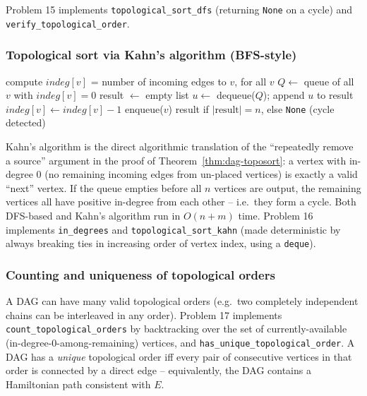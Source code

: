 \documentclass[11pt]{article}
\begin{document}
Problem 15 implements \texttt{topological\_sort\_dfs} (returning \texttt{None} on a
cycle) and \texttt{verify\_topological\_order}.

\subsubsection{Topological sort via Kahn's algorithm (BFS-style)}

\begin{algorithm}[h]
\caption{Kahn$(adj)$}
\begin{algorithmic}[1]
\State compute $indeg[v]$ = number of incoming edges to $v$, for all $v$
\State $Q \gets$ queue of all $v$ with $indeg[v] = 0$
\State result $\gets$ empty list
    \State $u \gets$ dequeue($Q$); append $u$ to result
        \State $indeg[v] \gets indeg[v] - 1$
            \State enqueue($v$)
        \EndIf
    \EndFor
\EndWhile
\State \Return result if $|\text{result}| = n$, else \texttt{None} (cycle detected)
\end{algorithmic}
\end{algorithm}

Kahn's algorithm is the direct algorithmic translation of the ``repeatedly remove a
source'' argument in the proof of Theorem~\ref{thm:dag-toposort}: a vertex with in-degree
0 (no remaining incoming edges from un-placed vertices) is exactly a valid ``next''
vertex. If the queue empties before all $n$ vertices are output, the remaining vertices
all have positive in-degree from each other -- i.e.\ they form a cycle. Both
DFS-based and Kahn's algorithm run in $O(n+m)$ time. Problem 16 implements
\texttt{in\_degrees} and \texttt{topological\_sort\_kahn} (made deterministic by always
breaking ties in increasing order of vertex index, using a \texttt{deque}).

\subsubsection{Counting and uniqueness of topological orders}

A DAG can have many valid topological orders (e.g.\ two completely independent chains can
be interleaved in any order). Problem 17 implements \texttt{count\_topological\_orders}
by backtracking over the set of currently-available (in-degree-0-among-remaining)
vertices, and \texttt{has\_unique\_topological\_order}. A DAG has a \emph{unique}
topological order iff every pair of consecutive vertices in that order is connected by a
direct edge -- equivalently, the DAG contains a Hamiltonian path consistent with $E$.
\end{document}
